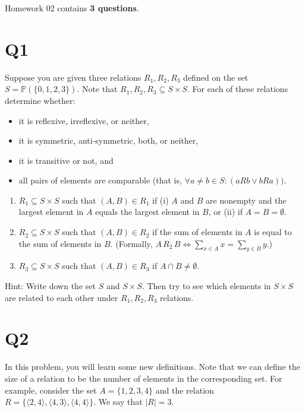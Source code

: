 \documentclass[12pt]{exam}
\begin{document}
Homework 02 contains \textbf{3 questions}.

\section{Q1}
Suppose you are given three relations $R_1, R_2, R_3$ defined on the set $S = \mathbb{P}(\{0,1,2,3\})$. Note that $R_1,R_2,R_3 \subseteq S \times S$. For each of these relations determine whether:

\begin{itemize}
    \item it is reflexive, irreflexive, or neither,
    \item it is symmetric, anti-symmetric, both, or neither,
    \item it is transitive or not, and
    \item all pairs of elements are comparable (that is, $\forall a \neq b \in S : (aRb \vee bRa))$.
\end{itemize}

\begin{enumerate}
    \item $R_1 \subseteq S \times S$ such that $(A, B) \in R_1$ if (i) $A$ and $B$ are nonempty and the largest element in $A$ equals the largest element in $B$, or (ii) if $A = B = \emptyset$.

    \item $R_2 \subseteq S \times S$ such that $(A, B) \in R_2$ if the sum of elements in $A$ is equal to the sum of elements in $B$. (Formally, $A\, R_2\,B \iff \sum_{x \in A} x =  \sum_{y \in B} y.$)

    \item $R_3 \subseteq S \times S$ such that $(A,B) \in R_3$ if $A \cap B \neq \emptyset$.
\end{enumerate}

Hint: Write down the set $S$ and $S\times S$. Then try to see which elements in $S \times S$ are related to each other under $R_1, R_2, R_3$ relations.

\section{Q2} 

In this problem, you will learn some new definitions. Note that we can define the size of a relation to be the number of elements in the corresponding set. For example, consider the set $A = \{1, 2, 3, 4\}$ and the relation $R = \{\langle 2, 4\rangle, \langle4, 3\rangle, \langle4, 4\rangle\}$. We say that $|R| = 3$.
\end{document}
